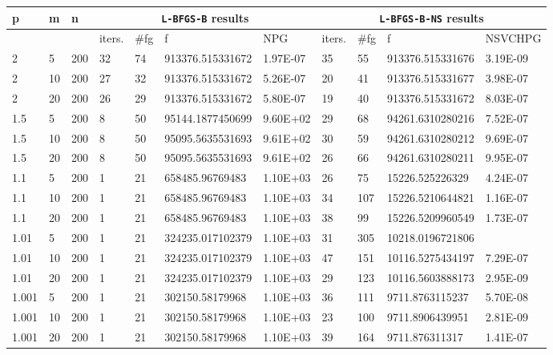 \begin{table}
  \tiny
  \begin{center}
    \begin{tabular}{|l|l|l|l|l|l|l|l|l|l|l|}
      \hline
      p & m & n  & \multicolumn{4}{|c|}{\texttt{L-BFGS-B} results} & \multicolumn{4}{|c|}{\texttt{L-BFGS-B-NS} results} \\ \hline
      &  & & iters. & \#fg & f & NPG & iters. & \#fg & f & NSVCHPG \\ \hline
      2 & 5 & 200 & 32 & 74 & 913376.515331672 & 1.97E-07 & 35 & 55 & 913376.515331676 & 3.19E-09\\
      2 & 10 &  200 & 27 & 32 & 913376.515331672 & 5.26E-07 & 20 & 41 & 913376.515331677 & 3.98E-07\\
      2 & 20 &  200 & 26 & 29 & 913376.515331672 & 5.80E-07 & 19 & 40 & 913376.515331672 & 8.03E-07\\
      1.5 & 5 & 200 &  8 & 50 & 95144.1877450699 & 9.60E+02 & 29 & 68 & 94261.6310280216 & 7.52E-07\\
      1.5 & 10 & 200 &  8 & 50 & 95095.5635531693 & 9.61E+02 & 30 & 59 & 94261.6310280212 & 9.69E-07\\
      1.5 & 20 & 200 &   8 & 50 & 95095.5635531693 & 9.61E+02 & 26 & 66 & 94261.6310280211 & 9.95E-07\\
      1.1 & 5 & 200 &  1 & 21 & 658485.96769483 & 1.10E+03 & 26 & 75 & 15226.525226329 & 4.24E-07\\
      1.1 & 10 & 200 &  1 & 21 & 658485.96769483 & 1.10E+03 & 34 & 107 & 15226.5210644821 & 1.16E-07\\
      1.1 & 20 & 200 &  1 & 21 & 658485.96769483 & 1.10E+03 & 38 & 99 & 15226.5209960549 & 1.73E-07\\
      1.01 & 5 & 200 &  1 & 21 & 324235.017102379 & 1.10E+03 & 31 & 305 & 10218.0196721806 & \\
      1.01 & 10 & 200 &  1 & 21 & 324235.017102379 & 1.10E+03 & 47 & 151 & 10116.5275434197 & 7.29E-07\\
      1.01 & 20 & 200 &  1 & 21 & 324235.017102379 & 1.10E+03 & 29 & 123 & 10116.5603888173 & 2.95E-09\\
      1.001 & 5 & 200 &  1 & 21 & 302150.58179968 & 1.10E+03 & 36 & 111 & 9711.8763115237 & 5.70E-08\\
      1.001 & 10 & 200 &  1 & 21 & 302150.58179968 & 1.10E+03 & 23 & 100 & 9711.8906439951 & 2.81E-09\\
      1.001 & 20 & 200 &  1 & 21 & 302150.58179968 & 1.10E+03 & 39 & 164 & 9711.876311317 & 1.41E-07\\

\end{tabular}
\end{center}
\end{table}
